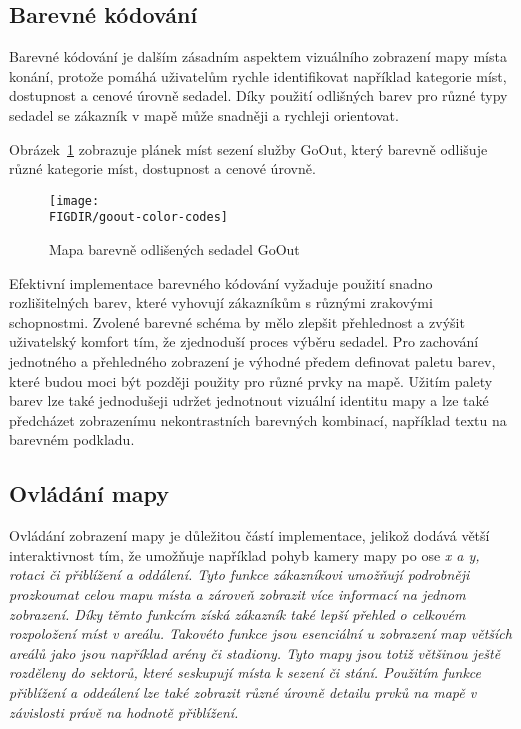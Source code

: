 \subsection{Barevné kódování}
\label{sec:specifikace-interaktivni-mapa-barevne-kody}
Barevné kódování je dalším zásadním aspektem vizuálního zobrazení mapy místa konání, protože pomáhá uživatelům rychle identifikovat například kategorie míst, dostupnost a cenové úrovně sedadel.
Díky použití odlišných barev pro různé typy sedadel se zákazník v mapě může snadněji a rychleji orientovat.

Obrázek~\ref{fig:goout-color-codes} zobrazuje plánek míst sezení služby GoOut, který barevně odlišuje různé kategorie míst, dostupnost a cenové úrovně.

\begin{figure}[H]
    \texttt{[image: \\FIGDIR/goout-color-codes]}
    \centering
    \caption{Mapa barevně odlišených sedadel GoOut}
    \label{fig:goout-color-codes}
\end{figure}

Efektivní implementace barevného kódování vyžaduje použití snadno rozlišitelných barev, které vyhovují zákazníkům s různými zrakovými schopnostmi.
Zvolené barevné schéma by mělo zlepšit přehlednost a zvýšit uživatelský komfort tím, že zjednoduší proces výběru sedadel.
Pro zachování jednotného a přehledného zobrazení je výhodné předem definovat paletu barev, které budou moci být později použity pro různé prvky na mapě.
Užitím palety barev lze také jednodušeji udržet jednotnout vizuální identitu mapy a lze také předcházet zobrazenímu nekontrastních barevných kombinací, například textu na barevném podkladu.

\subsection{Ovládání mapy}
\label{sec:specifikace-interaktivni-mapa-ovladani}
Ovládání zobrazení mapy je důležitou částí implementace, jelikož dodává větší interaktivnost tím, že umožňuje například pohyb kamery mapy po ose \em{x} a \em{y}, rotaci či přiblížení a oddálení.
Tyto funkce zákazníkovi umožňují podrobněji prozkoumat celou mapu místa a zároveň zobrazit více informací na jednom zobrazení.
Díky těmto funkcím získá zákazník také lepší přehled o celkovém rozpoložení míst v areálu.
Takovéto funkce jsou esenciální u zobrazení map větších areálů jako jsou například arény či stadiony.
Tyto mapy jsou totiž většinou ještě rozděleny do sektorů, které seskupují místa k sezení či stání.
Použitím funkce přiblížení a oddeálení lze také zobrazit různé úrovně detailu prvků na mapě v závislosti právě na hodnotě přiblížení.

